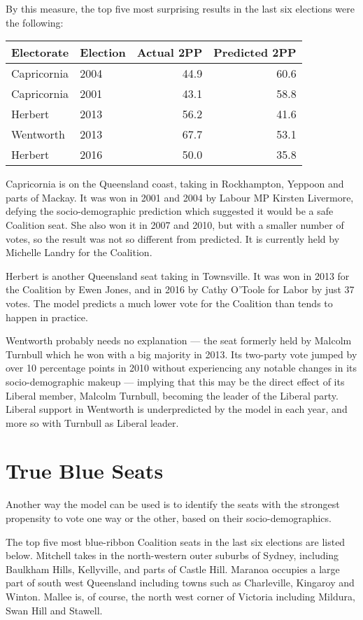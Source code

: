 \documentclass[11pt,a4paper,]{article}
\begin{document}
By this measure, the top five most surprising results in the last six elections were the following:

\begin{tabular}{llrr}
\toprule
Electorate & Election & Actual 2PP & Predicted 2PP\\
\midrule
Capricornia & 2004 & 44.9 & 60.6\\
Capricornia & 2001 & 43.1 & 58.8\\
Herbert & 2013 & 56.2 & 41.6\\
Wentworth & 2013 & 67.7 & 53.1\\
Herbert & 2016 & 50.0 & 35.8\\
\bottomrule
\end{tabular}

Capricornia is on the Queensland coast, taking in Rockhampton, Yeppoon and parts of Mackay. It was won in 2001 and 2004 by Labour MP Kirsten Livermore, defying the socio-demographic prediction which suggested it would be a safe Coalition seat. She also won it in 2007 and 2010, but with a smaller number of votes, so the result was not so different from predicted. It is currently held by Michelle Landry for the Coalition.

Herbert is another Queensland seat taking in Townsville. It was won in 2013 for the Coalition by Ewen Jones, and in 2016 by Cathy O'Toole for Labor by just 37 votes. The model predicts a much lower vote for the Coalition than tends to happen in practice.

Wentworth probably needs no explanation --- the seat formerly held by Malcolm Turnbull which he won with a big majority in 2013. Its two-party vote jumped by over 10 percentage points in 2010 without experiencing any notable changes in its socio-demographic makeup --- implying that this may be the direct effect of its Liberal member, Malcolm Turnbull, becoming the leader of the Liberal party. Liberal support in Wentworth is underpredicted by the model in each year, and more so with Turnbull as Liberal leader.

\hypertarget{true-blue-seats}{%
\section{True Blue Seats}\label{true-blue-seats}}

Another way the model can be used is to identify the seats with the strongest propensity to vote one way or the other, based on their socio-demographics.

The top five most blue-ribbon Coalition seats in the last six elections are listed below. Mitchell takes in the north-western outer suburbs of Sydney, including Baulkham Hills, Kellyville, and parts of Castle Hill. Maranoa occupies a large part of south west Queensland including towns such as Charleville, Kingaroy and Winton. Mallee is, of course, the north west corner of Victoria including Mildura, Swan Hill and Stawell.
\end{document}
